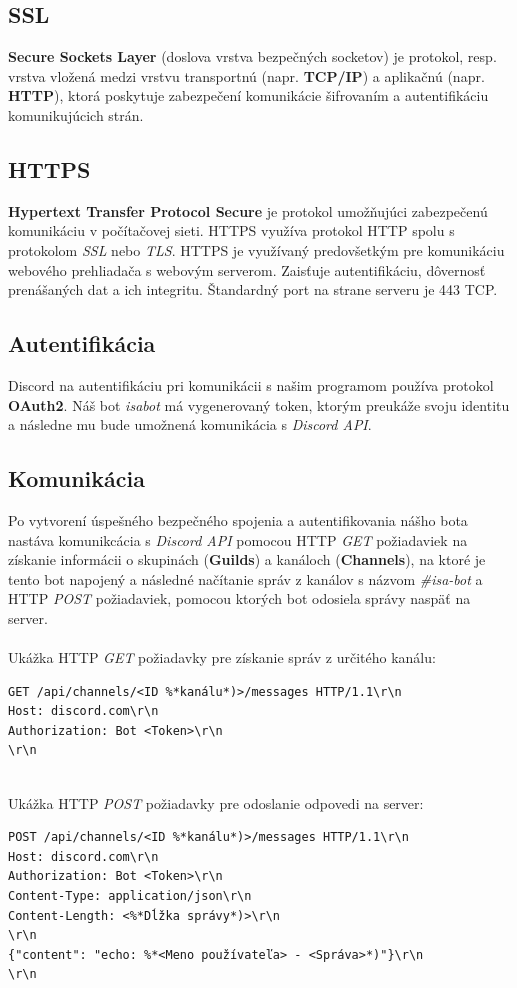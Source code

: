 \documentclass[a4paper,12pt]{article}
\begin{document}
\subsection{SSL}
\textbf{Secure Sockets Layer} (doslova vrstva bezpečných socketov) je protokol, resp. vrstva vložená medzi vrstvu transportnú (napr. \textbf{TCP/IP}) a aplikačnú (napr. \textbf{HTTP}), ktorá poskytuje zabezpečení komunikácie šifrovaním a autentifikáciu komunikujúcich strán. \cite{wiki_ssl}

\subsection{HTTPS}
\textbf{Hypertext Transfer Protocol Secure} je protokol umožňujúci zabezpečenú komunikáciu v počítačovej sieti. HTTPS využíva protokol HTTP spolu s protokolom \textit{SSL} nebo \textit{TLS}. HTTPS je využívaný predovšetkým pre komunikáciu webového prehliadača s webovým serverom. Zaisťuje autentifikáciu, dôvernosť prenášaných dat a ich integritu. Štandardný port na strane serveru je 443 TCP. \cite{wiki_https}


\subsection{Autentifikácia}
Discord na autentifikáciu pri komunikácii s našim programom používa protokol \textbf{OAuth2}. Náš bot \textit{isabot} má vygenerovaný token, ktorým preukáže svoju identitu a následne mu bude umožnená komunikácia s \textit{Discord API}.

\subsection{Komunikácia}
Po vytvorení úspešného bezpečného spojenia a autentifikovania nášho bota nastáva komunikcácia s \textit{Discord API} pomocou HTTP \textit{GET} požiadaviek na získanie informácii o skupinách (\textbf{Guilds}) a kanáloch (\textbf{Channels}), na ktoré je tento bot napojený a následné načítanie správ z kanálov s názvom \textit{\#isa-bot} a HTTP \textit{POST} požiadaviek, pomocou ktorých bot odosiela správy naspäť na server.
\leavevmode\\\\
Ukážka HTTP \textit{GET} požiadavky pre získanie správ z určitého kanálu:
\begin{lstlisting}
GET /api/channels/<ID %*kanálu*)>/messages HTTP/1.1\r\n
Host: discord.com\r\n
Authorization: Bot <Token>\r\n
\r\n
\end{lstlisting}
\leavevmode\\
Ukážka HTTP \textit{POST} požiadavky pre odoslanie odpovedi na server:
\begin{lstlisting}
POST /api/channels/<ID %*kanálu*)>/messages HTTP/1.1\r\n
Host: discord.com\r\n
Authorization: Bot <Token>\r\n
Content-Type: application/json\r\n
Content-Length: <%*Dĺžka správy*)>\r\n
\r\n
{"content": "echo: %*<Meno používateľa> - <Správa>*)"}\r\n
\r\n
\end{lstlisting}
\end{document}
